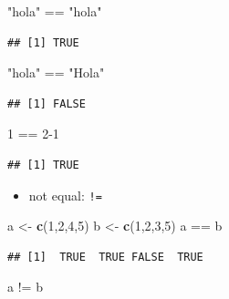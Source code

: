 \documentclass[]{article}
\def\tightlist{}
\newenvironment{Shaded}{\begin{snugshade}}{\end{snugshade}}
\newcommand{\KeywordTok}[1]{\textcolor[rgb]{0.13,0.29,0.53}{\textbf{{#1}}}}
\newcommand{\DecValTok}[1]{\textcolor[rgb]{0.00,0.00,0.81}{{#1}}}
\newcommand{\StringTok}[1]{\textcolor[rgb]{0.31,0.60,0.02}{{#1}}}
\newcommand{\NormalTok}[1]{{#1}}
\numberwithin{equation}{section}
\begin{document}
\begin{Shaded}
\begin{Highlighting}[]
  \StringTok{"hola"} \NormalTok{==}\StringTok{ "hola"}
\end{Highlighting}
\end{Shaded}

\begin{verbatim}
## [1] TRUE
\end{verbatim}

\begin{Shaded}
\begin{Highlighting}[]
  \StringTok{"hola"} \NormalTok{==}\StringTok{ "Hola"}
\end{Highlighting}
\end{Shaded}

\begin{verbatim}
## [1] FALSE
\end{verbatim}

\begin{Shaded}
\begin{Highlighting}[]
   \DecValTok{1} \NormalTok{==}\StringTok{ }\DecValTok{2-1}
\end{Highlighting}
\end{Shaded}

\begin{verbatim}
## [1] TRUE
\end{verbatim}

\begin{itemize}
\tightlist
\item
  not equal: \texttt{!=}
\end{itemize}

\begin{Shaded}
\begin{Highlighting}[]
    \NormalTok{a <-}\StringTok{ }\KeywordTok{c}\NormalTok{(}\DecValTok{1}\NormalTok{,}\DecValTok{2}\NormalTok{,}\DecValTok{4}\NormalTok{,}\DecValTok{5}\NormalTok{)}
    \NormalTok{b <-}\StringTok{ }\KeywordTok{c}\NormalTok{(}\DecValTok{1}\NormalTok{,}\DecValTok{2}\NormalTok{,}\DecValTok{3}\NormalTok{,}\DecValTok{5}\NormalTok{) }
    \NormalTok{a ==}\StringTok{ }\NormalTok{b}
\end{Highlighting}
\end{Shaded}

\begin{verbatim}
## [1]  TRUE  TRUE FALSE  TRUE
\end{verbatim}

\begin{Shaded}
\begin{Highlighting}[]
    \NormalTok{a !=}\StringTok{ }\NormalTok{b}
\end{Highlighting}
\end{Shaded}
\end{document}
